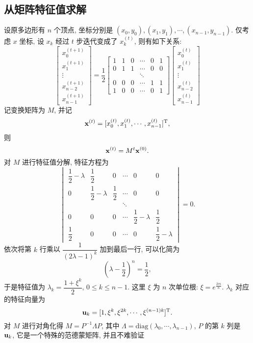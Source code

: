 \subsection {从矩阵特征值求解}

设原多边形有 $n$ 个顶点, 坐标分别是 $(x_0,y_0), (x_1,y_1), \cdots, (x_{n-1},y_{n-1})$. 仅考虑 $x$ 坐标, 设 $x_k$ 经过 $t$ 步迭代变成了 $x_k^{(t)}$, 则有如下关系:
\[ \begin{bmatrix} x_0^{(t+1)}\\x_1^{(t+1)}\\ \vdots \\x_{n-2}^{(t+1)} \\x_{n-1}^{(t+1)} \end{bmatrix} =  \frac{1}{2}\begin{bmatrix} 1 & 1 & 0 & \cdots & 0 & 1\\ 0 & 1 & 1 & \cdots & 0 & 0\\ & & & \ddots & & \\ 0 & 0 & 0 & \cdots & 1 & 1 \\ 1 & 0 & 0 & \cdots & 0 & 1\end{bmatrix} \begin{bmatrix} x_0^{(t)}\\x_1^{(t)}\\ \vdots \\x_{n-2}^{(t)} \\x_{n-1}^{(t)} \end{bmatrix} \]
记变换矩阵为 $M$, 并记
\[ \bold{x}^{(t)} =  [x_0^{(t)},x_1^{(t)},\cdots,x_{n-1}^{(t)}]^\mathrm{T} ,\]
则 
\[ \bold{x}^{(t)} = M^t \bold{x}^{(0)} .\]
对 $M$ 进行特征值分解, 特征方程为
\[ \begin{vmatrix} \dfrac{1}{2} - \lambda & \dfrac{1}{2} & 0 & \cdots & 0 & 0\\ 0 & \dfrac{1}{2} - \lambda & \dfrac{1}{2} & \cdots & 0 & 0\\ & & & \ddots & & \\ 0 & 0 & 0 & \cdots & \dfrac{1}{2} - \lambda & \dfrac{1}{2} \\ \dfrac{1}{2} & 0 & 0 & \cdots & 0 & \dfrac{1}{2} - \lambda\end{vmatrix} = 0.\]
依次将第 $k$ 行乘以 $\dfrac{1}{(2\lambda-1)^k}$ 加到最后一行, 可以化简为
\[ (\lambda - \frac{1}{2})^n = \frac{1}{2} ,\]
于是特征值为 $\lambda_k = \dfrac{1+\xi^k}{2}$, $0\le k\le n-1$. 这里 $\xi$ 为 $n$ 次单位根: $\xi = e^{\frac{2\pi i}{n}}$. $\lambda_k$ 对应的特征向量为
\[ \bold{u}_k = [1, \xi^k, \xi^{2k}, \cdots, \xi^{(n-1)k}]^\mathrm{T} .\]
对 $M$ 进行对角化得 $M = P^{-1}\Lambda P$, 其中 $\Lambda = \mathrm{diag}(\lambda_0,\cdots,\lambda_{n-1})$, $P$ 的第 $k$ 列是 $\bold{u}_k$, 它是一个特殊的范德蒙矩阵, 并且不难验证
